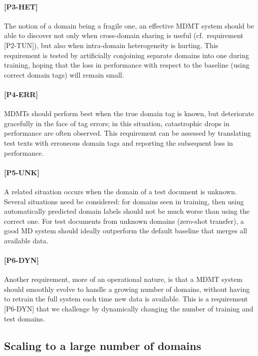 \documentclass[11pt,a4paper]{article}
\newcommand{\fyTodo}[1]{\Todo[FY:]{\textcolor{orange}{#1}}}
\newcommand{\fyDone}[1]{\done[FY]\Todo[FY:]{\textcolor{orange}{#1}}}
\newcommand{\jcDone}[1]{\done[JC]\Todo[JC:]{\textcolor{red}{#1}}}
\begin{document}
\paragraph{[P3-HET]}
The notion of a domain being a fragile one, an effective MDMT system should be able to discover not only when cross-domain sharing is useful (cf.\ requirement [P2-TUN])\jcDone{what is P2.2?}, but also when intra-domain heterogeneity is hurting. This requirement is tested by artificially conjoining separate domains into one during training, hoping that the loss in performance with respect to the baseline (using correct domain tags) will remain small.

\paragraph{[P4-ERR]}
MDMTs should perform best when the true domain tag is known, but deteriorate gracefully in the face of tag errors; in this situation, catastrophic drops in performance are often observed\fyDone{cite \cite{McCloskey89catastrophic}}. This requirement can be assessed by translating test texts with erroneous domain tags and reporting the subsequent loss in performance.

\paragraph{[P5-UNK]}
A related situation occurs when the domain of a test document is unknown. Several situations need be considered: for domains seen in training, then using automatically predicted domain labels should not be much worse than using the correct one. For test documents from unknown domains (zero-shot transfer), a good MD system should ideally outperform the default baseline that merges all available data.\fyDone{Systems react to unknown domains}

\paragraph{[P6-DYN]}
Another requirement, more of an operational nature, is that a MDMT system should smoothly evolve to handle a growing number of domains, without having to retrain the full system each time new data is available. This is a requirement [P6-DYN] that we challenge by dynamically changing the number of training and test domains.

\subsection{Scaling to a large number of domains \label{ssec:scaling}}
\end{document}

